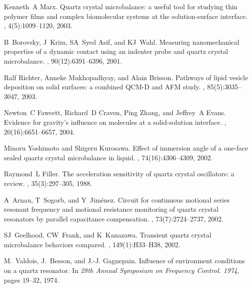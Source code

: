 \documentclass[floatfix,superscriptaddress,a4paper,twocolumn]{revtex4-1}
\begin{document}
\begin{thebibliography}{10}
Kenneth~A Marx.
\newblock Quartz crystal microbalance: a useful tool for studying thin polymer
  films and complex biomolecular systems at the solution-surface interface.
, 4(5):1099--1120, 2003.

B~Borovsky, J~Krim, SA~{Syed Asif}, and KJ~Wahl.
\newblock Measuring nanomechanical properties of a dynamic contact using an
  indenter probe and quartz crystal microbalance.
, 90(12):6391--6396, 2001.

Ralf Richter, Anneke Mukhopadhyay, and Alain Brisson.
\newblock Pathways of lipid vesicle deposition on solid surfaces: a combined
  {QCM-D} and {AFM} study.
, 85(5):3035--3047, 2003.

Newton~C Fawcett, Richard~D Craven, Ping Zhang, and Jeffrey~A Evans.
\newblock Evidence for gravity's influence on molecules at a solid-solution
  interface.
, 20(16):6651--6657, 2004.

Minoru Yoshimoto and Shigeru Kurosawa.
\newblock Effect of immersion angle of a one-face sealed quartz crystal
  microbalance in liquid.
, 74(16):4306--4309, 2002.

Raymond~L Filler.
\newblock The acceleration sensitivity of quartz crystal oscillators: a review.
, 35(3):297--305, 1988.

A~Arnau, T~Sogorb, and Y~Jim{\'e}nez.
\newblock Circuit for continuous motional series resonant frequency and
  motional resistance monitoring of quartz crystal resonators by parallel
  capacitance compensation.
, 73(7):2724--2737, 2002.

SJ~Geelhood, CW~Frank, and K~Kanazawa.
\newblock Transient quartz crystal microbalance behaviors compared.
, 149(1):H33--H38, 2002.

M.~Valdois, J.~Besson, and J.-J. Gagnepain.
\newblock Influence of environment conditions on a quartz resonator.
\newblock In {\em 28th Annual Symposium on Frequency Control. 1974}, pages
  19--32, 1974.


\end{thebibliography}
\end{document}
